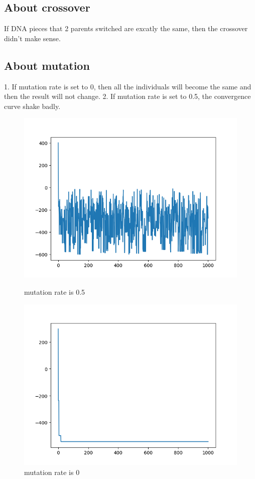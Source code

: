 \documentclass[11pt]{article} %
\begin{document}
\subsection{About crossover}
If DNA pieces that 2 parents switched are excatly the same, then the crossover didn't make sense.
\subsection{About mutation}
1. If mutation rate is set to 0, then all the individuals will become the same and then the result will not change.
2. If mutation rate is set to 0.5, the convergence curve shake badly.
\begin{figure}[htbp]
\centering
\begin{minipage}[t]{0.4\textwidth}
\includegraphics[scale=0.4]{m0.5.png}
\caption{mutation rate is 0.5}
\end{minipage}
\begin{minipage}[t]{0.4\textwidth}
\includegraphics[scale=0.4]{0.png}
\caption{mutation rate is 0}
\end{minipage}
\end{figure}
\end{document}

